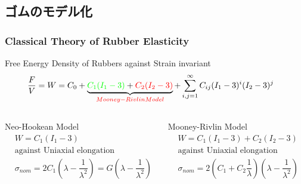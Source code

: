 \documentclass[aspectratio=169,11pt, dvipdfmx]{beamer}
\begin{document}
\subsection{ゴムのモデル化}
\begin{frame}
    \frametitle{Classical Theory of Rubber Elasticity}
        \vspace{-2mm}
		\begin{block}{Free Energy Density of Rubbers against Strain invariant}
			\vspace{-2mm}
			\scriptsize
			\begin{align*}
				\dfrac{F}{V} = W 
				&= C_0 + \underbrace{{\color{green}C_1(I_1-3)} + {\color{red}C_2(I_2-3)}}_{\color{red}Mooney-Rivlin Model} + \sum_{i,j = 1}^{\infty} C_{ij}(I_1-3)^i(I_2-3)^j
			\end{align*}  
		\end{block}
		\vspace{-5mm}
		\begin{columns}[T, onlytextwidth]
				\begin{exampleblock}{Neo-Hookean Model}
					\vspace{-2mm}
						\scriptsize
						\begin{align*}
							&W = C_1 (I_1-3) \\
							&\text{against Uniaxial elongation} \\
							&\sigma_{nom} = 2 C_1\left(\lambda - \dfrac{1}{\lambda^2}\right) = G \left(\lambda - \dfrac{1}{\lambda^2}\right)
						\end{align*}
				\end{exampleblock}
				\begin{alertblock}{Mooney-Rivlin Model}
					\vspace{-2mm}
					\scriptsize
					\begin{align*}
						&W = C_1 (I_1-3) + C_2(I_2-3) \\
						&\text{against Uniaxial elongation} \\
						&\sigma_{nom} = 2 \left(C_1 + C_2\dfrac{1}{\lambda} \right) \left(\lambda - \dfrac{1}{\lambda^2}\right)
					\end{align*}
				\end{alertblock}
		\end{columns}
		\vspace{-1mm}

\end{frame}
\end{document}
